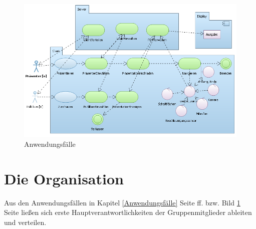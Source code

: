 \begin{figure}[ht!]
	\centering
	\includegraphics[angle=0,width=14cm]{ProjektOrganisation/Bilder/Anwendungsfaelle.png}
	\caption{Anwendungsfälle}
	\label{BildAnwendungsfaelle}
\end{figure}

\section{Die Organisation}
Aus den Anwendungsfällen in Kapitel \ref{Anwendungsfälle} Seite \pageref{Anwendungsfälle} ff. bzw. Bild \ref{BildAnwendungsfaelle} Seite \pageref{BildAnwendungsfaelle} ließen sich erste Hauptverantwortlichkeiten der Gruppenmitglieder ableiten und verteilen.\\

